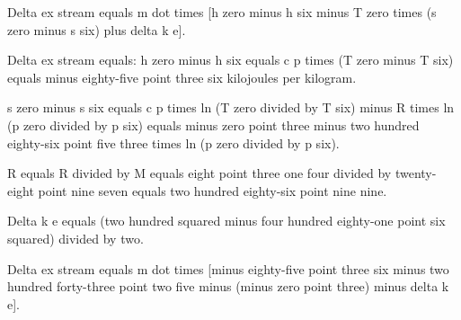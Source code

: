 Delta ex stream equals m dot times [h zero minus h six minus T zero times (s zero minus s six) plus delta k e].  

Delta ex stream equals:  
h zero minus h six equals c p times (T zero minus T six) equals minus eighty-five point three six kilojoules per kilogram.  

s zero minus s six equals c p times ln (T zero divided by T six) minus R times ln (p zero divided by p six) equals minus zero point three minus two hundred eighty-six point five three times ln (p zero divided by p six).  

R equals R divided by M equals eight point three one four divided by twenty-eight point nine seven equals two hundred eighty-six point nine nine.  

Delta k e equals (two hundred squared minus four hundred eighty-one point six squared) divided by two.  

Delta ex stream equals m dot times [minus eighty-five point three six minus two hundred forty-three point two five minus (minus zero point three) minus delta k e].